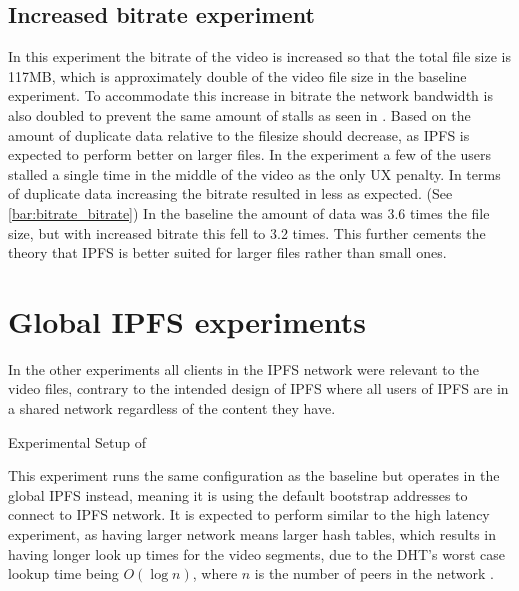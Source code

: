\subsection{Increased bitrate experiment}
In this experiment the bitrate of the video is increased so that the total file size is 117\ac{MB}, which is approximately double of the video file size in the baseline experiment. To accommodate this increase in bitrate the network bandwidth is also doubled to prevent the same amount of stalls as seen in . Based on  the amount of duplicate data relative to the filesize should decrease, as \ac{IPFS} is expected to perform better on larger files.
In the experiment a few of the users stalled a single time in the middle of the video as the only \ac{UX} penalty. In terms of duplicate data increasing the bitrate resulted in less as expected. (See \autoref{bar:bitrate_bitrate}) In the baseline the amount of data was 3.6 times the file size, but with increased bitrate this fell to 3.2 times. This further cements the theory that \ac{IPFS} is better suited for larger files rather than small ones.

\if{}

\fi

\FloatBarrier \section{Global IPFS experiments}
\label{sec:eval_global}

In the other experiments all clients in the \ac{IPFS} network were relevant to the video files, contrary to the intended design of \ac{IPFS} where all users of \ac{IPFS} are in a shared network regardless of the content they have.

\begin{table}[!htbp]
    \myfloatalign
    \caption[Experimental Setup of Global \acs{IPFS}]{Experimental Setup of }
    \label{tab:exp_overview_global}
    
\end{table}

This experiment runs the same configuration as the baseline but operates in the global \ac{IPFS} instead, meaning it is using the default bootstrap addresses to connect to \ac{IPFS} network.
It is expected to perform similar to the high latency experiment, as having larger network means larger hash tables, which results in having longer look up times for the video segments, due to the \ac{DHT}'s worst case lookup time being $ O ( \log n)$, where $n$ is the number of peers in the network \cite[p.2]{benet2014ipfs}.


